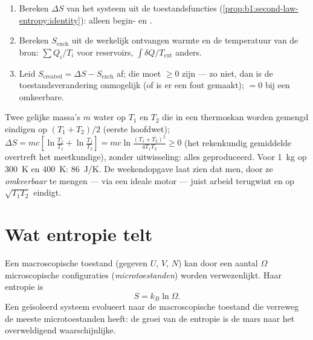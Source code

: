 \begin{method}\label{met:b1:second-law-entropy:method}
\begin{enumerate}
  \item Bereken $\Delta S$ van het systeem uit de toestandsfuncties
        (\cref{prop:b1:second-law-entropy:identity}): alleen begin- en
        .
  \item Bereken $S_{\mathrm{exch}}$ uit de werkelijk ontvangen warmte en de
        temperatuur van de bron: $\sum Q_i/T_i$ voor reservoirs,
        $\int\delta Q/T_{\mathrm{ext}}$ anders.
  \item Leid $S_{\mathrm{created}} = \Delta S - S_{\mathrm{exch}}$ af; die moet
        $\geq 0$ zijn --- zo niet, dan is de toestandsverandering onmogelijk (of is er
        een fout gemaakt); $= 0$ bij een omkeerbare.
\end{enumerate}
\end{method}

\begin{example}\label{ex:b1:second-law-entropy:mixing}
Twee gelijke massa's $m$ water op $T_1$ en $T_2$ die in een thermoskan worden gemengd eindigen op
$(T_1 + T_2)/2$ (eerste hoofdwet); $\Delta S = mc[\ln\frac{T_f}{T_1} + \ln\frac{T_f}{T_2}]
= mc\ln\frac{(T_1 + T_2)^2}{4T_1T_2} \geq 0$ (het rekenkundig gemiddelde overtreft het
meetkundige), zonder uitwisseling: alles geproduceerd. Voor \qty{1}{kg} op \qty{300}{K} en
\qty{400}{K}: \qty{86}{J/K}. De weekendopgave laat zien dat men, door ze
\emph{omkeerbaar} te mengen --- via een ideale motor --- juist
arbeid terugwint en op $\sqrt{T_1T_2}$ eindigt.
\end{example}

\section{Wat entropie telt}

\begin{proposition}\label{prop:b1:second-law-entropy:boltzmann}
Een macroscopische toestand (gegeven $U$, $V$, $N$) kan door een aantal
$\Omega$ microscopische configuraties (\emph{microtoestanden}) worden verwezenlijkt. Haar entropie is
\[
S = k_B\ln\Omega .
\]
Een geïsoleerd systeem evolueert naar de macroscopische toestand die verreweg
de meeste microtoestanden heeft: de groei van de entropie is de mars naar
het overweldigend waarschijnlijke.
\end{proposition}
\admitted

